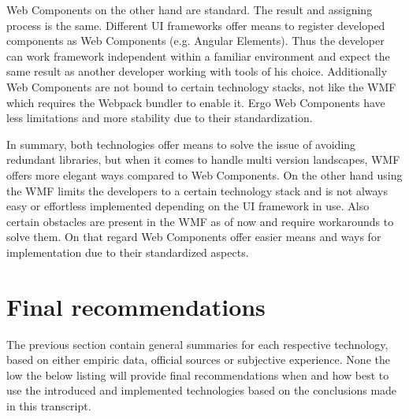 Web Components on the other hand are standard. The result and assigning process is the same. Different UI frameworks offer means to register developed components as Web Components (e.g. Angular Elements). Thus the developer can work framework independent within a familiar environment and expect the same result as another developer working with tools of his choice.
Additionally Web Components are not bound to certain technology stacks, not like the WMF which requires the Webpack bundler to enable it. Ergo Web Components have less limitations and more stability due to their standardization.

In summary, both technologies offer means to solve the issue of avoiding redundant libraries, but when it comes to handle multi version landscapes, WMF offers more elegant ways compared to Web Components. On the other hand using the WMF limits the developers to a certain technology stack and is not always easy or effortless implemented depending on the UI framework in use. Also certain obstacles are present in the WMF as of now and require workarounds to solve them.\cite{wmf_the_good_and_ugly} On that regard Web Components offer easier means and ways for implementation due to their standardized aspects.

\section{Final recommendations}

The previous section contain general summaries for each respective technology, based on either empiric data, official sources or subjective experience. None the low the below listing will provide final recommendations when and how best to use the introduced and implemented technologies based on the conclusions made in this transcript.

